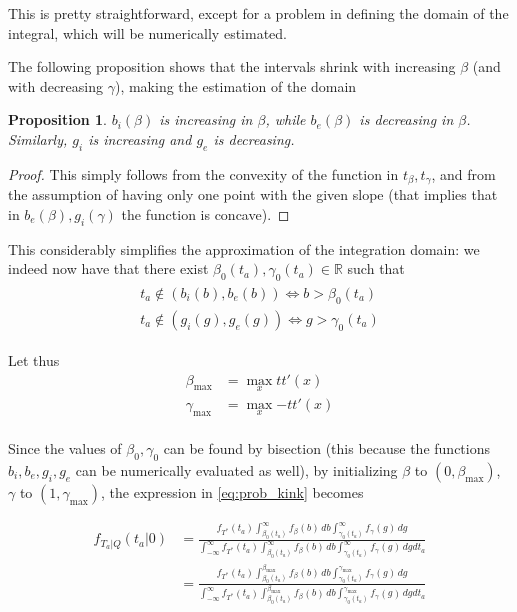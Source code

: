 \documentclass{article}
\newtheorem{prop}{Proposition}
\begin{document}
This is pretty straightforward, except for a problem in defining the domain of the integral, which will be numerically estimated.

The following proposition shows that the intervals shrink with increasing \(\beta\) (and with decreasing \(\gamma\)), making the estimation of the domain
\begin{prop}
  \(b_i(\beta)\) is increasing in \(\beta\), while \(b_e(\beta)\) is decreasing in \(\beta\).
  Similarly, \(g_i\) is increasing and \(g_e\) is decreasing.
\end{prop}
\begin{proof}
  This simply follows from the convexity of the function in \(t_\beta, t_\gamma\), and from the assumption of having only one point with the given slope (that implies that in \(b_e(\beta), g_i(\gamma)\) the function is concave).
\end{proof}
This considerably simplifies the approximation of the integration domain:
we indeed now have that there exist \(\beta_0(t_a), \gamma_0(t_a) \in \mathbb{R}\) such that
\begin{align}
  \label{eq:threshold_integration}
  \begin{split}
     t_a \not\in (b_i(b), b_e(b)) \iff b > \beta_0(t_a) \\
    t_a \not\in (g_i(g), g_e(g)) \iff g > \gamma_0(t_a)
  \end{split}
\end{align}

Let thus
\begin{align*}
  \beta_\text{max} & = \max_x{tt'(x)} \\
  \gamma_\text{max} & = \max_x{-tt'(x)} \\
\end{align*}

Since the values of \(\beta_0, \gamma_0\) can be found by bisection (this because the functions \(b_i, b_e, g_i, g_e\) can be numerically evaluated as well), by initializing \(\beta\) to \((0, \beta_\text{max})\), \(\gamma\) to \((1, \gamma_\text{max})\), the expression in \eqref{eq:prob_kink} becomes

\begin{align*}
  f_{T_a | Q}(t_a | 0) & = \frac{f_{T^*}(t_a)\int_{\beta_0(t_a)}^\infty f_\beta(b)\, db\int_{\gamma_0(t_a)}^\infty f_\gamma(g)\, dg}{\int_{-\infty}^\infty f_{T^*}(t_a)\int_{\beta_0(t_a)}^\infty f_\beta(b)\, db\int_{\gamma_0(t_a)}^\infty f_\gamma(g)\, dgdt_a} \\
  & = \frac{f_{T^*}(t_a)\int_{\beta_0(t_a)}^{\beta_\text{max}}f_\beta(b)\, db\int_{\gamma_0(t_a)}^{\gamma_\text{max}}f_\gamma(g)\, dg}{\int_{-\infty}^\infty f_{T^*}(t_a)\int_{\beta_0(t_a)}^{\beta_\text{max}}f_\beta(b)\, db\int_{\gamma_0(t_a)}^{\gamma_\text{max}}f_\gamma(g)\, dgdt_a}
\end{align*}
\end{document}
